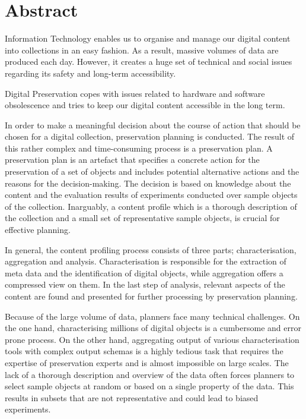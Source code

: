 \chapter*{Abstract}
\vspace{-1cm}
Information Technology enables us to organise and manage our digital content into collections in an easy fashion. As a result, massive volumes of data are produced each day. However, it creates a huge set of technical and social issues regarding its safety and long-term accessibility.

Digital Preservation copes with issues related to hardware and software obsolescence and tries to keep our digital content accessible in the long term.

In order to make a meaningful decision about the course of action that should be chosen for a digital collection, preservation planning is conducted. 
The result of this rather complex and time-consuming process is a preservation plan.
A preservation plan is an artefact that specifies a concrete action for the preservation of a set of objects and includes potential alternative actions and the reasons for the decision-making. The decision is based on knowledge about the content and the evaluation results of experiments conducted over sample objects of the collection.
Inarguably, a content profile which is a thorough description of the collection and a small set of representative sample objects, is crucial for effective planning.

In general, the content profiling process consists of three parts; characterisation, aggregation and analysis.
Characterisation is responsible for the extraction of meta data and the identification of digital objects, while aggregation offers a compressed view on them.
In the last step of analysis, relevant aspects of the content are found and presented for further processing by preservation planning.

Because of the large volume of data, planners face many technical challenges. On the one hand, characterising millions of digital objects is a cumbersome and error prone process. On the other hand, aggregating output of various characterisation tools with complex output schemas is a highly tedious task that requires the expertise of preservation experts and is almost impossible on large scales. The lack of a thorough description and overview of the data often forces planners to select sample objects at random or based on a single property of the data. This results in subsets that are not representative and could lead to biased experiments.

